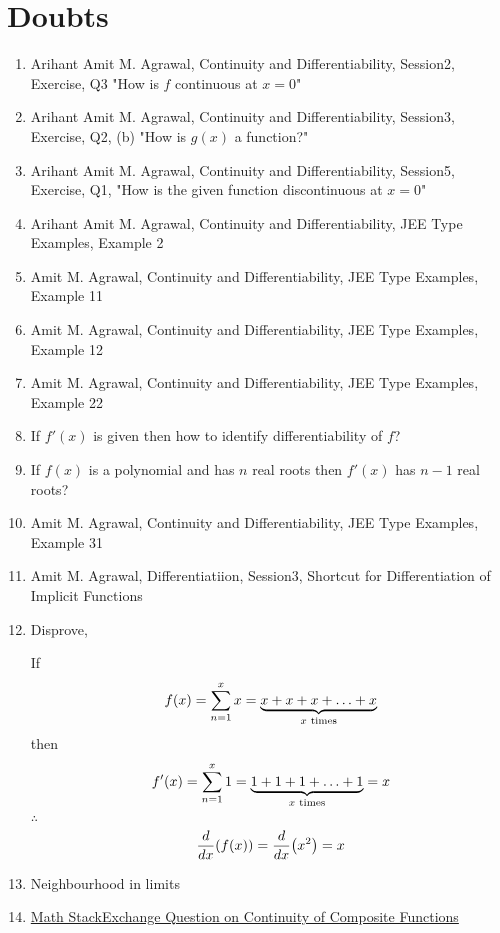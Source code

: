 \documentclass{article}
\title{}
\author{}
\date{}
\begin{document}
\maketitle

\section{Doubts}
\begin{enumerate}
    \item Arihant Amit M. Agrawal, Continuity and Differentiability, Session2, Exercise, Q3 "How is $f$ continuous at $x=0$"
    \item Arihant Amit M. Agrawal, Continuity and Differentiability, Session3, Exercise, Q2, (b) "How is $g(x)$ a function?"
    \item Arihant Amit M. Agrawal, Continuity and Differentiability, Session5, Exercise, Q1, "How is the given function discontinuous at $x=0$"
    \item Arihant Amit M. Agrawal, Continuity and Differentiability, JEE Type Examples, Example 2
    \item Amit M. Agrawal, Continuity and Differentiability, JEE Type Examples, Example 11
    \item Amit M. Agrawal, Continuity and Differentiability, JEE Type Examples, Example 12
    \item Amit M. Agrawal, Continuity and Differentiability, JEE Type Examples, Example 22
    \item If $f'(x)$ is given then how to identify differentiability of $f$?
    \item If $f(x)$ is a polynomial and has $n$ real roots then $f'(x)$ has $n-1$ real roots?
    \item Amit M. Agrawal, Continuity and Differentiability, JEE Type Examples, Example 31
    \item Amit M. Agrawal, Differentiatiion, Session3, Shortcut for Differentiation of Implicit Functions
    \item Disprove,

          If $$f(x)=\displaystyle\sum_{n=1}^{x} x=\underbrace{x+x+x+\ldots +x}_{x \hspace{1mm} \text{times}}$$
          then $$f'(x)=\displaystyle\sum_{n=1}^{x} 1=\underbrace{1+1+1+\ldots+1}_{x \hspace{1mm} \text{times}}=x$$
          $\therefore$ $$\dv{x}(f(x))=\dv{x}(x^2)=x$$
    \item Neighbourhood in limits
    \item \href{https://math.stackexchange.com/questions/4892287/is-this-result-on-continuity-of-composite-functions-true}{Math StackExchange Question on Continuity of Composite Functions}
\end{enumerate}
\end{document}
